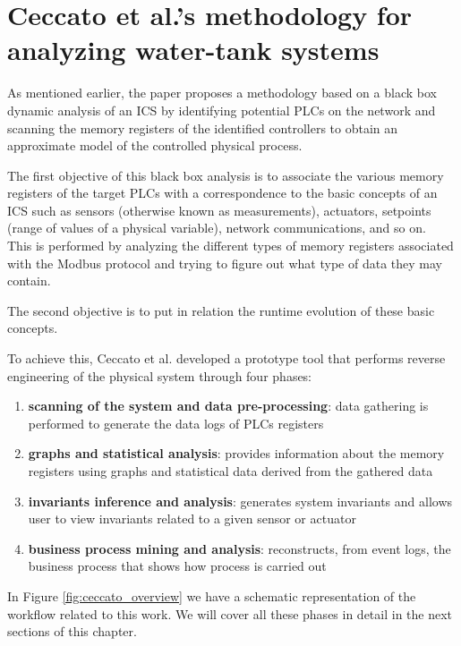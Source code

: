 \section{Ceccato et al.’s methodology for analyzing water-tank systems}
\label{sec:ceccato_metodology}
As mentioned earlier, the paper proposes a methodology based on a black box dynamic analysis of an ICS by identifying potential PLCs on the network and scanning the memory registers of the identified controllers to obtain an approximate model of the controlled physical process.

\bigskip
The first objective of this black box analysis is to associate the various memory registers of the target PLCs with a correspondence to the basic concepts of an ICS such as sensors (otherwise known as measurements), actuators, setpoints (range of values of a physical variable), network communications, and so on.\\
This is performed by analyzing the different types of memory registers associated with the Modbus protocol and trying to figure out what type of data they may contain.

The second objective is to put in relation the runtime evolution of these basic concepts.

\bigskip
To achieve this, Ceccato et al. developed a prototype tool \cite{plc_re} that performs reverse engineering of the physical system through four phases:

\begin{enumerate}
	\item \textbf{scanning of the system and data pre-processing}: data gathering is performed to generate the data logs of PLCs registers
	
	\item \textbf{graphs and statistical analysis}: provides information about the memory registers using graphs and statistical data derived from the gathered data
	
	\item \textbf{invariants inference and analysis}: generates system invariants and allows user to view invariants related to a given sensor or actuator
	
	\item \textbf{business process mining and analysis}: reconstructs, from event logs, the business process that shows how process is carried out
\end{enumerate}

In Figure \ref{fig:ceccato_overview} we have a schematic representation of the workflow related to this work. We will cover all these phases in detail in the next sections of this chapter. 

